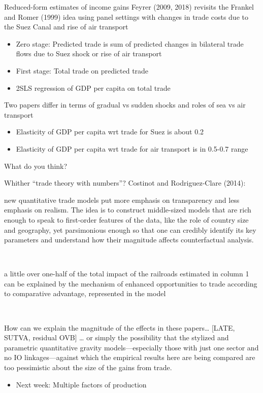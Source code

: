 \documentclass[10pt,notes=hide]{beamer}
\begin{document}
\begin{frame}{Reduced-form estimates of income gains}
Feyrer (2009, 2018) revisits the Frankel and Romer (1999) idea using 
panel settings with changes in trade costs due to the Suez Canal and rise of air transport
\begin{itemize}
	\item Zero stage: Predicted trade is sum of predicted changes in bilateral trade flows due to Suez shock or rise of air transport
	\item First stage: Total trade on predicted trade
	\item 2SLS regression of GDP per capita on total trade
\end{itemize}
Two papers differ in terms of gradual vs sudden shocks and roles of sea vs air transport \\
\begin{itemize}
	\item Elasticity of GDP per capita wrt trade for Suez is about 0.2
	\item Elasticity of GDP per capita wrt trade for air transport is in 0.5-0.7 range
\end{itemize}
What do you think?
\end{frame}
\begin{frame}{Whither ``trade theory with numbers''?}
Costinot and Rodriguez-Clare (2014): \\
{\footnotesize
new quantitative trade models put more emphasis on transparency and less emphasis on realism. The idea is to construct middle-sized models that are rich enough to speak to first-order features of the data, like the role of country size and geography, yet parsimonious enough so that one can credibly identify its key parameters and understand how their magnitude affects counterfactual analysis.\par}
 \\
{\footnotesize a little over one-half of the total impact of the railroads estimated in column 1 can be explained by the mechanism of enhanced opportunities to trade according to comparative advantage, represented in the model\par}
 \\
{\footnotesize How can we explain the magnitude of the effects in these papers\dots
[LATE, SUTVA, residual OVB]
\dots
or simply the possibility that the stylized and parametric quantitative gravity models—especially those with just one sector and no IO linkages—against which the empirical results here are being compared are too pessimistic about the size of the gains from trade.
\par}
\end{frame}
\begin{frame}[plain]
\begin{itemize}
	\item Next week: Multiple factors of production
\end{itemize}
\end{frame}
\end{document}
